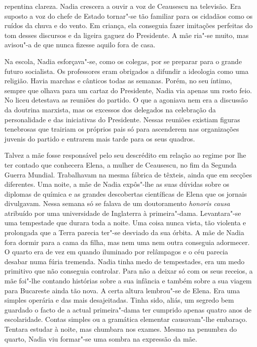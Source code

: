 repentina clareza. Nadia crescera a ouvir a voz de Ceausescu na
televisão. Era suposto a voz do chefe de Estado tornar"-se tão familiar
para os cidadãos como os ruídos da chuva e do vento. Em criança, ela
conseguia fazer imitações perfeitas do tom desses discursos e da
ligeira gaguez
do Presidente. A mãe ria"-se muito, mas avisou"-a de que nunca fizesse
aquilo fora de casa.

Na escola, Nadia esforçava"-se, como os colegas, por se preparar para o
grande futuro socialista. Os professores eram obrigados a difundir a
ideologia como uma religião. Havia marchas e cânticos todas as semanas.
Porém, no seu íntimo, sempre que olhava para um cartaz do Presidente,
Nadia via apenas um rosto feio. No liceu detestava as reuniões do
partido. O que a agoniava nem era a discussão da doutrina marxista, mas
os excessos dos delegados na celebração da personalidade e das
iniciativas do Presidente. Nessas reuniões existiam figuras tenebrosas
que trairiam os próprios pais só para ascenderem nas organizações
juvenis do partido e entrarem mais tarde para os seus quadros.

Talvez a mãe fosse responsável pelo seu descrédito em relação ao regime
por lhe ter contado que conhecera Elena, a mulher de Ceausescu, no fim
da Segunda Guerra Mundial. Trabalhavam na mesma fábrica de têxteis,
ainda que em secções diferentes. Uma noite, a mãe de Nadia expôs"-lhe as
suas dúvidas sobre os diplomas de química e as grandes descobertas
científicas de Elena que os jornais divulgavam. Nessa semana só se
falava de um doutoramento \emph{honoris causa} atribuído por uma universidade de Inglaterra à
primeira"-dama. Levantara"-se uma tempestade que durara toda a noite. Uma
coisa nunca vista, tão violenta e prolongada que a Terra parecia
ter"-se desviado da sua órbita. A mãe de Nadia fora dormir para a cama da
filha, mas nem uma nem outra conseguia adormecer. O quarto era de vez em
quando iluminado por relâmpagos e o céu parecia desabar numa fúria
tremenda. Nadia tinha medo de tempestades, era um medo primitivo que não conseguia controlar. Para não a
deixar só com os seus receios, a mãe foi"-lhe contando histórias sobre a
sua infância e também sobre a sua viagem para Bucareste ainda tão nova.
A certa altura lembrou"-se de Elena. Era uma simples operária e das mais
desajeitadas. Tinha sido, aliás, um segredo bem guardado o facto de a
actual primeira"-dama ter cumprido apenas quatro anos de escolaridade.
Contas simples ou a gramática elementar causavam"-lhe embaraço. Tentara
estudar à noite, mas chumbara nos exames. Mesmo na penumbra do quarto,
Nadia viu formar"-se uma sombra na expressão da mãe.

